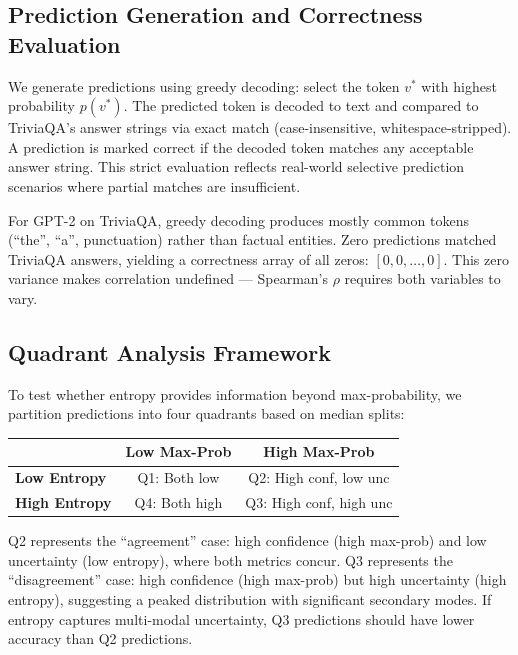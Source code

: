\subsection{Prediction Generation and Correctness Evaluation}

We generate predictions using greedy decoding: select the token $v^*$ with highest probability $p(v^*)$. The predicted token is decoded to text and compared to TriviaQA's answer strings via exact match (case-insensitive, whitespace-stripped). A prediction is marked correct if the decoded token matches any acceptable answer string. This strict evaluation reflects real-world selective prediction scenarios where partial matches are insufficient.

For GPT-2 on TriviaQA, greedy decoding produces mostly common tokens (``the'', ``a'', punctuation) rather than factual entities. Zero predictions matched TriviaQA answers, yielding a correctness array of all zeros: $[0, 0, \ldots, 0]$. This zero variance makes correlation undefined --- Spearman's $\rho$ requires both variables to vary.

\subsection{Quadrant Analysis Framework}

To test whether entropy provides information beyond max-probability, we partition predictions into four quadrants based on median splits:

\begin{table}[h]
\centering
\begin{tabular}{lcc}
\toprule
 & \textbf{Low Max-Prob} & \textbf{High Max-Prob} \\
\midrule
\textbf{Low Entropy} & Q1: Both low & Q2: High conf, low unc \\
\textbf{High Entropy} & Q4: Both high & Q3: High conf, high unc \\
\bottomrule
\end{tabular}
\end{table}

Q2 represents the ``agreement'' case: high confidence (high max-prob) and low uncertainty (low entropy), where both metrics concur. Q3 represents the ``disagreement'' case: high confidence (high max-prob) but high uncertainty (high entropy), suggesting a peaked distribution with significant secondary modes. If entropy captures multi-modal uncertainty, Q3 predictions should have lower accuracy than Q2 predictions.

